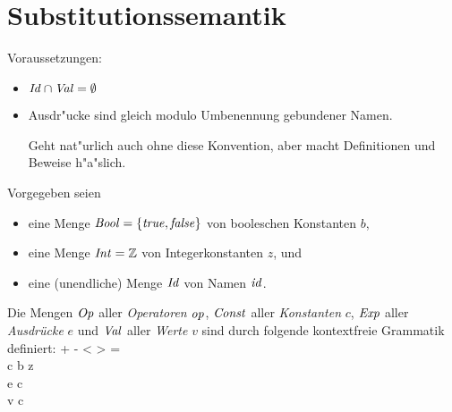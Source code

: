 \documentclass[12pt,fleqn,a4paper]{article}
\begin{document}
\section{Substitutionssemantik}

Voraussetzungen:
\begin{itemize}
  \item ${\text{\it Id\/}} \cap {\text{\it Val\/}} = \emptyset$

  \item Ausdr"ucke sind gleich modulo Umbenennung gebundener Namen.

        Geht nat"urlich auch ohne diese Konvention, aber macht Definitionen und Beweise h"a"slich.
\end{itemize}

\begin{definition}
  Vorgegeben seien
  \begin{itemize}
  \item eine Menge ${\text{\it Bool\/}} = \{{\text{\it true\/}},{\text{\it false\/}}\}$ von booleschen Konstanten $b$,
  \item eine Menge ${\text{\it Int\/}} = {\mathord{\mathbb Z}}$ von Integerkonstanten $z$, und
  \item eine (unendliche) Menge ${\text{\it Id\/}}$ von Namen ${\text{\it id\/}}$.
  \end{itemize}
  Die Mengen ${\text{\it Op\/}}$ aller {\em Operatoren} ${\text{\it op\/}}$, ${\text{\it Const\/}}$ aller {\em Konstanten} $c$, ${\text{\it Exp\/}}$ aller 
  {\em Ausdr\"ucke} $e$ und ${\text{\it Val\/}}$ aller {\em Werte} $v$ sind durch folgende kontextfreie Grammatik definiert:
  \bgram
  \op \is + \mid - \mid * \mid \le \mid \ge \mid < \mid > \mid = \\
  c \is b \mid z \mid \op \mid \bfix \\
  e \is c \mid \id \mid {} \mid {} \mid {} \\
  v \is c \mid {} \mid {}
  \egram
\end{definition}
\end{document}
